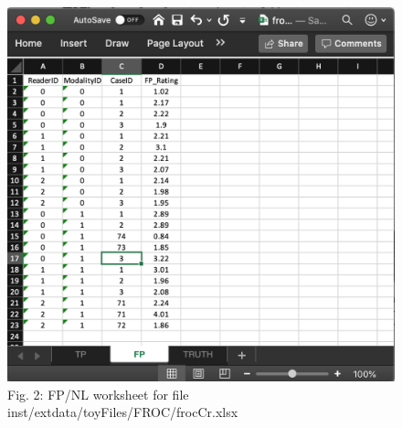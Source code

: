 \documentclass[
]{book}
\begin{document}
\begin{figure}

{\centering \includegraphics[width=0.5\linewidth,height=0.2\textheight]{images/frocCrNL} 

}

\caption{Fig. 2: FP/NL worksheet for file inst/extdata/toyFiles/FROC/frocCr.xlsx}\label{fig:frocCrNL}
\end{figure}
\end{document}
